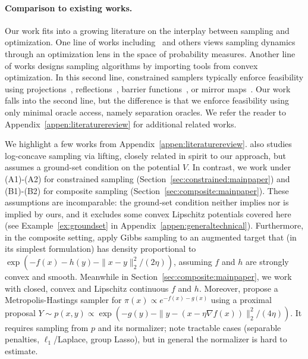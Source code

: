 \documentclass[11pt,letterpaper]{article}
\begin{document}
\paragraph*{Comparison to existing works.} 
Our work fits into a growing literature on the interplay between sampling and optimization. One line of works including~\cite{durmus2019analysis,jordan1998variational,wibisono2018sampling} and others views sampling dynamics through an optimization lens in the space of probability measures. Another line of works designs sampling algorithms by importing tools from convex optimization. In this second line, constrained samplers typically enforce feasibility using projections~\cite{brosse2017sampling,Bubeck2018}, reflections~\cite{du2025non,wang2025accelerating}, barrier functions~\cite{kook2022sampling,kook2024gaussian}, or mirror maps~\cite{ahn2021efficient,hsieh2018mirrored,srinivasan2024fast,zhang2020wasserstein}. Our work falls into the second line, but the difference is that we enforce feasibility using only minimal oracle access, namely separation oracles. We refer the reader to Appendix~\ref{appen:literaturereview} for additional related works.





We highlight a few works from Appendix~\ref{appen:literaturereview}. 
\cite{kook2025algodiffusion} also studies log-concave sampling via lifting, closely related in spirit to our approach, but assumes a ground-set condition on the potential $V$. 
In contrast, we work under (A1)-(A2) for constrained sampling (Section~\ref{sec:constrained:mainpaper}) and (B1)-(B2) for composite sampling (Section~\ref{sec:composite:mainpaper}). 
These assumptions are incomparable: the ground-set condition neither implies nor is implied by ours, and it excludes some convex Lipschitz potentials covered here (see Example~\ref{ex:groundset} in Appendix~\ref{appen:generaltechnical}). Furthermore, in the composite setting, \cite{yuan2023class} apply Gibbs sampling to an augmented target that (in its simplest formulation) has density proportional to $\exp\!\left(-f(x)-h(y)-\|x-y\|_2^2/(2\eta)\right)$, assuming $f$ and $h$ are strongly convex and smooth. Meanwhile in Section~\ref{sec:composite:mainpaper}, we work with closed, convex and Lipschitz continuous $f$ and $h$. Moreover, \cite{mou2022composite} propose a Metropolis-Hastings sampler for $\pi(x)\propto e^{-f(x)-g(x)}$ using a proximal proposal
$Y\sim p(x,y)\propto \exp\!\left(-g(y)-\|y-(x-\eta\nabla f(x))\|_2^2/(4\eta)\right)$.
It requires sampling from $p$ and its normalizer; \cite{mou2022composite} note tractable cases (separable penalties, $\ell_1$/Laplace, group Lasso), but in general the normalizer is hard to estimate.
\end{document}

